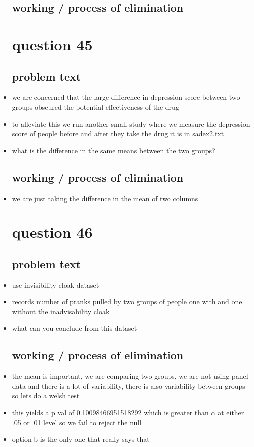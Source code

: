 \documentclass{article}
\begin{document}
\begin{itemize}
\subsection{working / process of elimination }

\section{question 45}
\subsection{problem text}
\item we are concerned that the large difference in depression score between two groups obscured the potential effectiveness of the drug
\item to alleviate this we run another small study where we measure the depression score of people before and after they take the drug it is in sadex2.txt
\item what is the difference in the same means between the two groups? 
\subsection{working / process of elimination }
\item we are just taking the difference in the mean of two columns


\section{question 46}
\subsection{problem text}
\item use invisibility cloak dataset
\item records number of pranks pulled by two groups of people one with and one without the inadvisability cloak 
\item what can you conclude from this dataset
\subsection{working / process of elimination }

\item the mean is important, we are comparing two groups, we are not using panel data and there is a lot of variability, there is also variability between groups so lets do a welsh test 
\item this yields a p val of 0.10098466951518292 which is greater than $\alpha$ at either .05 or .01 level so we fail to reject the null
\item option b is the only one that really says that 


\end{itemize}
\end{document}
